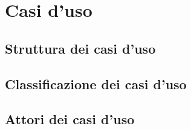 \section{Casi d'uso}
	\subsection{Struttura dei casi d'uso}
		
	\subsection{Classificazione dei casi d'uso}
	\subsection{Attori dei casi d'uso}
